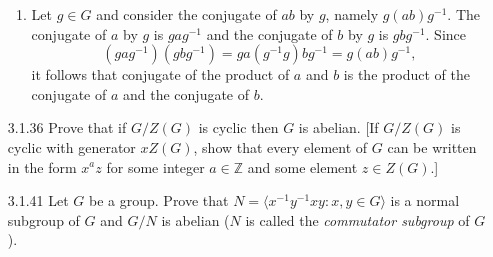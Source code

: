 \documentclass[9pt]{article}
\newcommand{\cyc}[1]{\langle #1 \rangle}
\newcommand{\Z}{\mathbb{Z}}
\begin{document}
\begin{enumerate}
   \begin{enumerate}
      \item Let $g \in G$ and consider the conjugate of $ab$ by $g$, namely
            $g(ab)g^{-1}$. The conjugate of $a$ by $g$ is $gag^{-1}$ and the
            conjugate of $b$ by $g$ is $gbg^{-1}$. Since
            $$(gag^{-1})(gbg^{-1}) = ga(g^{-1}g)bg^{-1} = g(ab)g^{-1},$$
            it follows that conjugate of the product of $a$ and $b$ is the
            product of the conjugate of $a$ and the conjugate of $b$.
   \end{enumerate}
   \item[3.1.36]  Prove that if $G/Z(G)$ is cyclic then $G$ is abelian. [If
                  $G/Z(G)$ is cyclic with generator $xZ(G)$, show that every
                  element of $G$ can be written in the form $x^az$ for some
                  integer $a \in \Z$ and some element $z \in Z(G)$.]
   \item[3.1.41]  Let $G$ be a group. Prove that
                  $N = \cyc{x^{-1}y^{-1}xy : x, y \in G}$ is a normal subgroup
                  of $G$ and $G/N$ is abelian ($N$ is called the
                  \textit{commutator subgroup} of $G$).
\end{enumerate}
\end{document}

